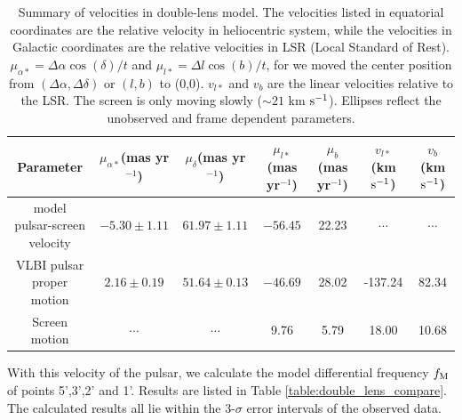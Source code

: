 \documentclass[useAMS,usenatbib]{mn2e}
\begin{document}
\begin{table}
\centering
\begin{tabular}{c|cccccc}
\hline
Parameter & $\mu_{\alpha*}$(mas yr$^{-1}$) & $\mu_{\delta}$(mas yr$^{-1}$) & $\mu_{l*}$(mas yr$^{-1}$) & $\mu_b$ (mas yr$^{-1}$) & $v_{l*}$ (km $\rm s^{-1}$) & $v_b$ (km $\rm s^{-1}$) \\
\hline
model pulsar-screen velocity & $-5.30 \pm 1.11$  & $61.97 \pm 1.11$  & $-56.45$ & 22.23 &  $\cdots$ & $\cdots$\\
VLBI pulsar proper motion & $2.16 \pm 0.19$ & $51.64 \pm 0.13$ & $-46.69$ & 28.02 & -137.24 & 82.34 \\
Screen motion & $\cdots$ & $\cdots$  & 9.76 & 5.79 & 18.00 & 10.68\\
\hline
\end{tabular}
\caption{Summary of velocities in double-lens model.  The velocities
listed in equatorial coordinates are the relative velocity in
heliocentric system, while the velocities in Galactic coordinates are
the relative velocities in LSR (Local Standard of Rest). $\mu_{\alpha*}=\Delta\alpha\cos(\delta)/t$ and $\mu_{l*}=\Delta l\cos(b)/t$, for we moved the center position from $(\Delta\alpha,\Delta\delta)$ or $(l,b)$ to (0,0).  $v_{l*}$ and $v_b$ are the linear velocities relative to the LSR.  The screen is
only moving slowly ($\sim 21$ km $\rm s^{-1}$).  Ellipses reflect the
unobserved and frame dependent parameters.
}
\label{Table:velocity}
\end{table}





With this velocity of the pulsar, we calculate the model differential frequency $f_{\rm M}$ of points 5',3',2' and 1'. Results are listed in Table \ref{table:double_lens_compare}. The calculated results all lie within the 3-$\sigma$ error intervals of the observed data. 
\end{document}
